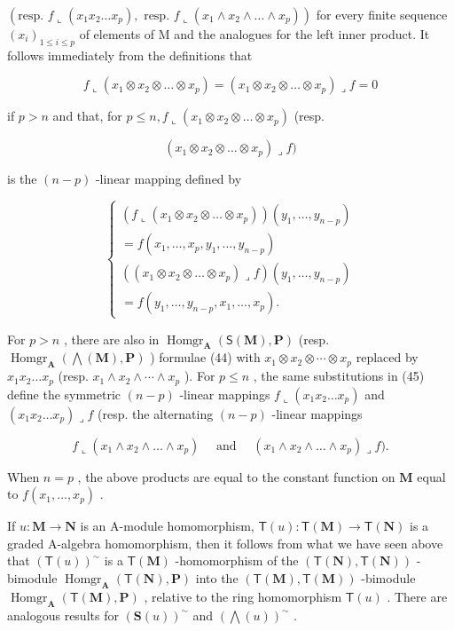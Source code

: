 \((\text{resp. } f \llcorner (x_1 x_2 \ldots x_p), \text{ resp. } f \llcorner (x_1 \wedge x_2 \wedge \dots \wedge x_p))\) for every finite sequence \((x_i)_{1 \leq i \leq p}\) of elements of M and the analogues for the left inner product. It follows immediately from the definitions that

\[
f \llcorner (x _ {1} \otimes x _ {2} \otimes \dots \otimes x _ {p}) = (x _ {1} \otimes x _ {2} \otimes \dots \otimes x _ {p}) \lrcorner f = 0\tag{44}
\]

if \(p > n\) and that, for \(p \leqslant n, f \llcorner (x_1 \otimes x_2 \otimes \dots \otimes x_p)\) (resp.

\[
\left(x _ {1} \otimes x _ {2} \otimes \dots \otimes x _ {p}\right) \lrcorner f)
\]

is the \((n - p)\) -linear mapping defined by

\[
\left\{ \begin{array}{l} (f \llcorner (x _ {1} \otimes x _ {2} \otimes \dots \otimes x _ {p})) (y _ {1}, \ldots , y _ {n - p}) \\ = f (x _ {1}, \ldots , x _ {p}, y _ {1}, \ldots , y _ {n - p}) \\ ((x _ {1} \otimes x _ {2} \otimes \dots \otimes x _ {p}) \lrcorner f) (y _ {1}, \ldots , y _ {n - p}) \\ = f (y _ {1}, \ldots , y _ {n - p}, x _ {1}, \ldots , x _ {p}). \end{array} \right.\tag{45}
\]

For \(p > n\) , there are also in \(\operatorname{Homgr}_{\mathbf{A}}(\mathsf{S}(\mathbf{M}), \mathbf{P})\) (resp. \(\operatorname{Homgr}_{\mathbf{A}}(\bigwedge(\mathbf{M}), \mathbf{P})\) ) formulae (44) with \(x_1 \otimes x_2 \otimes \cdots \otimes x_p\) replaced by \(x_1x_2 \ldots x_p\) (resp. \(x_1 \wedge x_2 \wedge \cdots \wedge x_p\) ). For \(p \leqslant n\) , the same substitutions in (45) define the symmetric \((n - p)\) -linear mappings \(f \llcorner (x_1x_2 \ldots x_p)\) and \((x_1x_2 \ldots x_p) \lrcorner f\) (resp. the alternating \((n - p)\) -linear mappings

\[
f \llcorner (x _ {1} \wedge x _ {2} \wedge \dots \wedge x _ {p}) \quad \text { and } \quad (x _ {1} \wedge x _ {2} \wedge \dots \wedge x _ {p}) \lrcorner f).
\]

When \(n = p\) , the above products are equal to the constant function on \(\mathbf{M}\) equal to \(f(x_{1},\ldots ,x_{p})\) .

If \(u: \mathbf{M} \to \mathbf{N}\) is an A-module homomorphism, \(\mathsf{T}(u): \mathsf{T}(\mathbf{M}) \to \mathsf{T}(\mathbf{N})\) is a graded A-algebra homomorphism, then it follows from what we have seen above that \((\mathsf{T}(u))^{\sim}\) is a \(\mathsf{T}(\mathbf{M})\) -homomorphism of the \((\mathsf{T}(\mathbf{N}), \mathsf{T}(\mathbf{N}))\) -bimodule \(\operatorname{Homgr}_{\mathbf{A}}(\mathsf{T}(\mathbf{N}), \mathbf{P})\) into the \((\mathsf{T}(\mathbf{M}), \mathsf{T}(\mathbf{M}))\) -bimodule \(\operatorname{Homgr}_{\mathbf{A}}(\mathsf{T}(\mathbf{M}), \mathbf{P})\) , relative to the ring homomorphism \(\mathsf{T}(u)\) . There are analogous results for \((\mathbf{S}(u))^{\sim}\) and \((\bigwedge(u))^{\sim}\) .
